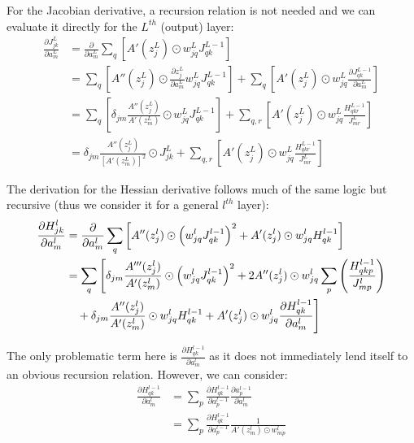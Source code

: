 \documentclass{article}
\begin{document}
For the Jacobian derivative, a recursion relation is not needed and we can evaluate it directly for the \(L^{th}\) (output) layer:
\begin{align}
\frac{\partial J_{jk}^L}{\partial a_m^L} &= \frac{\partial}{\partial a_m^L} \sum_q \left[ A'(z_j^L) \odot w_{jq}^L J_{qk}^{L-1} \right] \\
&= \sum_{q} \left[ A''(z_j^L) \odot \frac{\partial z_j^L}{\partial a_m^L} w_{jq}^L J_{qk}^{L-1} \right] + \sum_q \left[ A'(z_j^L) \odot w_{jq}^L \frac{\partial J_{qk}^{L-1}}{\partial a_m^L} \right] \\
&= \sum_{q} \left[ \delta_{jm} \frac{A''(z_j^L)}{A'(z_m^L)} \odot w_{jq}^L J_{qk}^{L-1} \right] + \sum_{q, r} \left[ A'(z_j^L) \odot w_{jq}^L \frac{H_{qkr}^{L-1}}{J_{mr}^L} \right] \\
&= \delta_{jm} \frac{A''(z_j^L)}{[A'(z_m^L)]^2} \odot J_{jk}^L + \sum_{q, r} \left[ A'(z_j^L) \odot w_{jq}^L \frac{H_{qkr}^{L-1}}{J_{mr}^L} \right]
\end{align}

The derivation for the Hessian derivative follows much of the same logic but  recursive (thus we consider it for a general \(l^{th}\) layer):
\begin{align}
\frac{\partial H_{jk}^l}{\partial a_m^l} 
&= \frac{\partial}{\partial a_m^l} \sum_q \left[ A''(z_j^l) \odot \left( w_{jq}^l J_{qk}^{l-1} \right)^2 + A'(z_j^l) \odot w_{jq}^l H_{qk}^{l-1} \right] \\
&= \sum_q \Bigg[
    \delta_{jm} \frac{A'''(z_j^l)}{A'(z_m^l)} \odot \left( w_{jq}^l J_{qk}^{l-1} \right)^2
    + 2 A''(z_j^l) \odot w_{jq}^l \sum_p \left( \frac{H_{qkp}^{l-1}}{J_{mp}^l} \right) \notag \\
&\quad
    + \delta_{jm} \frac{A''(z_j^l)}{A'(z_m^l)} \odot w_{jq}^l H_{qk}^{l-1}
    + A'(z_j^l) \odot w_{jq}^l \frac{\partial H_{qk}^{l-1}}{\partial a_m^l}
\Bigg]
\end{align}

The only problematic term here is \(\frac{\partial H_{qk}^{l-1}}{\partial a_m^l}\) as it does not immediately lend itself to an obvious recursion relation. However, we can consider:
\begin{align}
\frac{\partial H_{qk}^{l-1}}{\partial a_m^l} &= \sum_p \frac{\partial H_{qk}^{l-1}}{\partial a_p^{l-1}} \frac{\partial a_{p}^{l-1}}{\partial a_m^l} \\
&= \sum_p \frac{\partial H_{qk}^{l-1}}{\partial a_p^{l-1}} \frac{1}{A'(z_m^l) \odot w_{mp}^l}
\end{align}
\end{document}
